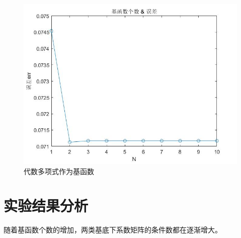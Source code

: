 \documentclass{article}
\begin{document}
\begin{figure}[H]
\centering
\includegraphics[scale=0.4]{N_err_2.jpg}
\caption{\label{N_err_2}代数多项式作为基函数}
\end{figure}



\newpage
\section{实验结果分析}
随着基函数个数的增加，两类基底下系数矩阵的条件数都在逐渐增大。
\end{document}
